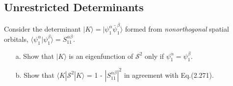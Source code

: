 \documentclass[a4paper]{book}
\newcounter{exercise}[chapter]
\begin{document}
	\subsection{Unrestricted Determinants}
	
	\begin{exercise}
	Consider the determinant $| K \rangle = |\psi_1^\alpha \bar{\psi}^\beta_1 \rangle$ formed from {\it nonorthogonal} spatial orbitals, $\langle \psi^\alpha_1 | \psi^\beta_1 \rangle = S^{\alpha\beta}_{11}$. 
	\begin{enumerate}
	
	\item[a.] Show that $| K \rangle$ is an eigenfunction of $\mathscr{S}^2$ only if $\psi^\alpha_1 = \psi^\beta_1$.
	
	\item[b.] Show that $\langle K | \mathscr{S}^2 | K \rangle$ = 1 - $|S^{\alpha\beta}_{11}|^2$ in agreement with Eq.(2.271).	
	
	\end{enumerate}
	\end{exercise}
	
\end{document}
